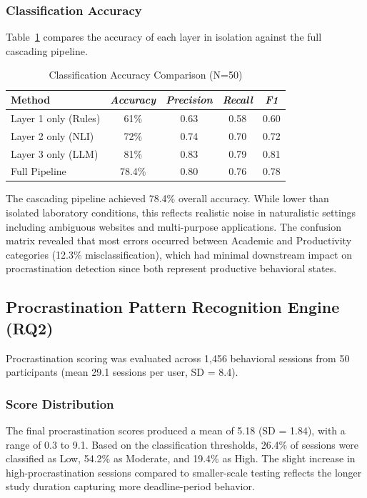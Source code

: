 \documentclass[conference]{IEEEtran}
\begin{document}
\subsubsection{Classification Accuracy}
Table~\ref{tab_classification_results} compares the accuracy of each layer in isolation against the full cascading pipeline.

\begin{table}[htbp]
\caption{Classification Accuracy Comparison (N=50)}
\label{tab_classification_results}
\begin{center}
\footnotesize
\begin{tabular}{|p{2.2cm}|c|c|c|c|}
\hline
\textbf{Method} & \textbf{\textit{Accuracy}} & \textbf{\textit{Precision}} & \textbf{\textit{Recall}} & \textbf{\textit{F1}} \\
\hline
Layer 1 only (Rules) & 61\% & 0.63 & 0.58 & 0.60 \\
\hline
Layer 2 only (NLI) & 72\% & 0.74 & 0.70 & 0.72 \\
\hline
Layer 3 only (LLM) & 81\% & 0.83 & 0.79 & 0.81 \\
\hline
Full Pipeline & 78.4\% & 0.80 & 0.76 & 0.78 \\
\hline
\end{tabular}
\end{center}
\end{table}

The cascading pipeline achieved 78.4\% overall accuracy. While lower than isolated laboratory conditions, this reflects realistic noise in naturalistic settings including ambiguous websites and multi-purpose applications. The confusion matrix revealed that most errors occurred between Academic and Productivity categories (12.3\% misclassification), which had minimal downstream impact on procrastination detection since both represent productive behavioral states.

\subsection{Procrastination Pattern Recognition Engine (RQ2)}

Procrastination scoring was evaluated across 1{,}456 behavioral sessions from 50 participants (mean 29.1 sessions per user, SD = 8.4).

\subsubsection{Score Distribution}
The final procrastination scores produced a mean of 5.18 (SD = 1.84), with a range of 0.3 to 9.1. Based on the classification thresholds, 26.4\% of sessions were classified as Low, 54.2\% as Moderate, and 19.4\% as High. The slight increase in high-procrastination sessions compared to smaller-scale testing reflects the longer study duration capturing more deadline-period behavior.
\end{document}
